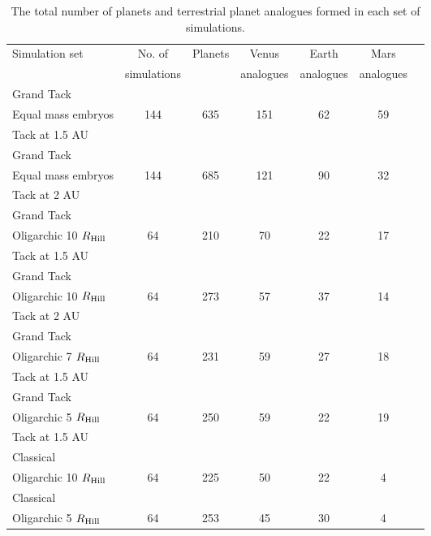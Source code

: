 \documentclass{aa}
\begin{document}
\begin{table*}

\caption{The total number of planets and terrestrial planet analogues formed in each set of simulations.}
\label{tb:planet_stat}
\begin{tabular}{lcccccc}

\hline\hline
Simulation set & No. of & Planets & Venus & Earth & Mars \\
 & simulations & & analogues & analogues & analogues\\
\hline
Grand Tack &  &  &  &  & \\
Equal mass embryos & 144 & 635 & 151 & 62 & 59\\
Tack at 1.5 AU &  &  &  &  & \\ \hline
Grand Tack &   &  &  &  & \\
Equal mass embryos & 144 & 685 & 121 & 90 & 32 \\
Tack at 2 AU &  & & & & \\ \hline
Grand Tack &  &  &  & \\
Oligarchic 10 $R_{\rm Hill}$ & 64 & 210 & 70 & 22 & 17 \\
Tack at 1.5 AU &  &  &  & \\ \hline
Grand Tack &  &  &  & \\
Oligarchic 10 $R_{\rm Hill}$ & 64 & 273 & 57 & 37 & 14 \\
Tack at 2 AU  &  &  & & \\ \hline
Grand Tack   &  &  &  &  \\
Oligarchic 7 $R_{\rm Hill}$ & 64 & 231 & 59 & 27 & 18 \\
Tack at 1.5 AU &  &  &  &  \\ \hline
Grand Tack   &  &  &  &  \\
Oligarchic 5 $R_{\rm Hill}$ & 64 & 250 & 59 & 22 & 19 \\
Tack at 1.5 AU  &  &  &  &  \\ \hline
Classical   \\
Oligarchic 10 $R_{\rm Hill}$ & 64 & 225 & 50 & 22 & 4 \\ \hline
Classical \\ 
Oligarchic 5 $R_{\rm Hill}$ & 64 & 253 & 45 & 30 & 4  \\ \hline
\end{tabular}
\end{table*}
\end{document}
